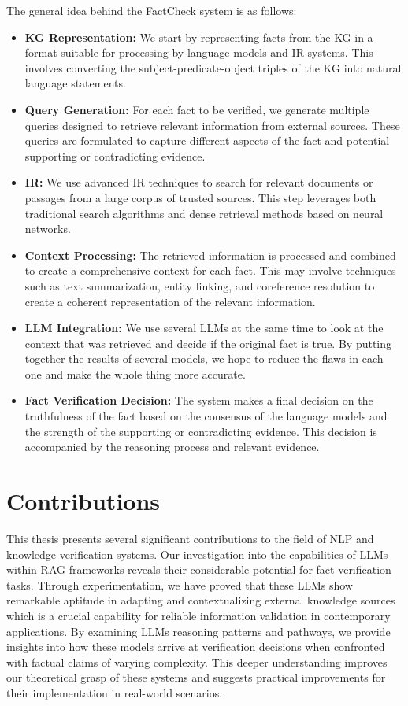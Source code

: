 The general idea behind the FactCheck system is as follows:
\begin{itemize}
    \item \textbf{\ac{KG} Representation:} We start by representing facts from the \ac{KG} in a format suitable for processing by language models and \ac{IR} systems. This involves converting the subject-predicate-object triples of the \ac{KG} into natural language statements.
    \item \textbf{Query Generation:} For each fact to be verified, we generate multiple queries designed to retrieve relevant information from external sources. These queries are formulated to capture different aspects of the fact and potential supporting or contradicting evidence.
    \item \textbf{\ac{IR}:} We use advanced \ac{IR} techniques to search for relevant documents or passages from a large corpus of trusted sources. This step leverages both traditional search algorithms and dense retrieval methods based on neural networks.
    \item \textbf{Context Processing:} The retrieved information is processed and combined to create a comprehensive context for each fact. This may involve techniques such as text summarization, entity linking, and coreference resolution to create a coherent representation of the relevant information.
    \item \textbf{\ac{LLM} Integration:} We use several \ac{LLMs} at the same time to look at the context that was retrieved and decide if the original fact is true. By putting together the results of several models, we hope to reduce the flaws in each one and make the whole thing more accurate.
    \item \textbf{Fact Verification Decision:} The system makes a final decision on the truthfulness of the fact based on the consensus of the language models and the strength of the supporting or contradicting evidence. This decision is accompanied by the reasoning process and relevant evidence.
\end{itemize}

\section{Contributions}\label{sec:contributions}
This thesis presents several significant contributions to the field of \ac{NLP} and knowledge verification systems.
Our investigation into the capabilities of \acp{LLM} within \ac{RAG} frameworks reveals their considerable potential for fact-verification tasks.
Through experimentation, we have proved that these \acp{LLM} show remarkable aptitude in adapting and contextualizing external knowledge sources which is a crucial capability for reliable information validation in contemporary applications.
By examining \acp{LLM} reasoning patterns and pathways, we provide insights into how these models arrive at verification decisions when confronted with factual claims of varying complexity.
This deeper understanding improves our theoretical grasp of these systems and suggests practical improvements for their implementation in real-world scenarios.

